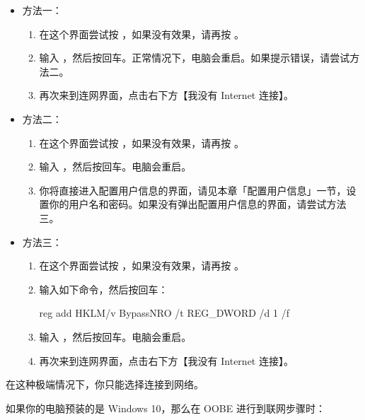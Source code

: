 \begin{itemize}
  \item 方法一：
    \begin{enumerate}
      \item 在这个界面尝试按 ，如果没有效果，请再按 。
      \item 输入 ，然后按回车。正常情况下，电脑会重启。如果提示错误，请尝试方法二。
      \item 再次来到连网界面，点击右下方【我没有 Internet 连接】。
    \end{enumerate}
  \item 方法二：
    \begin{enumerate}
      \item 在这个界面尝试按 ，如果没有效果，请再按 。
      \item 输入 ，然后按回车。电脑会重启。
      \item 你将直接进入配置用户信息的界面，请见本章「配置用户信息」一节，设置你的用户名和密码。如果没有弹出配置用户信息的界面，请尝试方法三。
    \end{enumerate}
  \item 方法三：
    \begin{enumerate}
      \item 在这个界面尝试按 ，如果没有效果，请再按 。
      \item 输入如下命令，然后按回车：
        \begin{MissingVerbatim}[bat]
          reg add HKLM\SOFTWARE\Microsoft\Windows\CurrentVersion\OOBE /v BypassNRO /t REG_DWORD /d 1 /f
        \end{MissingVerbatim}
      \item 输入 ，然后按回车。电脑会重启。
      \item 再次来到连网界面，点击右下方【我没有 Internet 连接】。
    \end{enumerate}
\end{itemize}

在这种极端情况下，你只能选择连接到网络。

如果你的电脑预装的是 Windows 10，那么在 OOBE 进行到联网步骤时：

